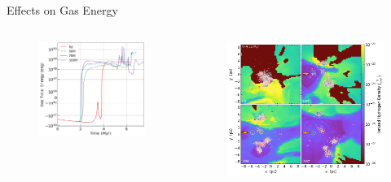 \documentclass[aspectratio=169]{beamer}
\begin{document}
\begin{frame}{Effects on Gas Energy}{}
    \begin{columns}
        \begin{column}{0.45\textwidth}
            \begin{figure}[h!]
                \centering
                \includegraphics[width=\linewidth]{../images/global_gas_total_energy_fixes.png} \\
                \label{fig:energy}
            \end{figure}
        \end{column}
        \begin{column}{0.45\textwidth}
            \begin{figure}[h!]
                \centering
                \includegraphics[width=\linewidth]{../images/ionized_H_slice.png} \\
                \label{fig:ionized}
            \end{figure}
        \end{column}
    \end{columns}
\end{frame} 
\end{document}
